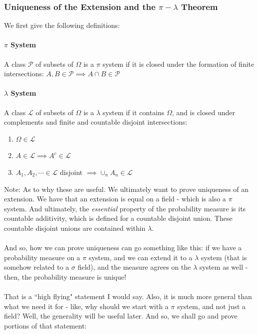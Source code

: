 \documentclass[12pt,a4paper]{article}
\newcommand{\1}[1]{\mathbbm{1}\left\{ #1 \right\}}
\newcommand{\lcal}{\mathcal{L}}
\newcommand{\pcal}{\mathcal{P}}
\begin{document}
\subsubsection{Uniqueness of the Extension and the $\pi-\lambda$ Theorem}
We first give the following definitions:

\paragraph{$\pi$ System} A class $\pcal$ of subsets of $\Omega$ is a $\pi$ system if it is closed under the formation of finite intersections: $A,B \in \pcal \implies A \cap B \in \pcal$

\paragraph{$\lambda$ System} A class $\lcal$ of subsets of $\Omega$ is a $\lambda$ system if it contains $\Omega$, and is closed under complements and finite and countable disjoint intersections:
\begin{enumerate}
	\item $\Omega \in \lcal$
	\item $A \in \lcal \implies A^c \in \lcal$
	\item $A_1, A_2, \cdots \in \lcal$ disjoint $\implies \cup_n A_n \in \lcal$
\end{enumerate}

Note: As to why these are useful. We ultimately want to prove uniqueness of an extension. We have that an extension is equal on a field - which is also a $\pi$ system. And ultimately, the \textit{essential} property of the probability measure is its countable additivity, which is defined for a countable disjoint union. These countable disjoint unions are contained within $\lambda$.
\\\\
And so, how we can prove uniqueness can go something like this: if we have a probability measure on a $\pi$ system, and we can extend it to a $\lambda$ system (that is somehow related to a $\sigma$ field), and the measure agrees on the $\lambda$ system as well - then, the probability measure is unique!
\\\\
That is a ``high flying" statement I would say. Also, it is much more general than what we need it for - like, why should we start with a $\pi$ system, and not just a field? Well, the generality will be useful later. And so, we shall go and prove portions of that statement:
\end{document}
